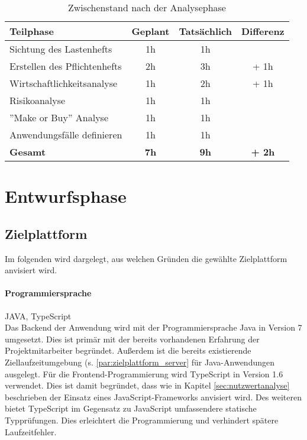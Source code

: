 \documentclass[12pt, xcolor=dvipsnames]{scrartcl}
\begin{document}
\begin{table}[H]
	\centering
	\begin{tabular}{lccc}

		\rowcolor{white!15}				
		\textbf{Teilphase} & \textbf{Geplant} & \textbf{Tatsächlich} & \textbf{Differenz} \\\hline		
		

		Sichtung des Lastenhefts & 1h & 1h & \\	    
	    Erstellen des Pflichtenhefts & 2h & 3h &  + 1h\\	    
	    Wirtschaftlichkeitsanalyse & 1h & 2h & + 1h\\	     
	    Risikoanalyse & 1h & 1h & \\	      
	    ''Make or Buy'' Analyse & 1h & 1h & \\	    
		Anwendungsfälle definieren & 1h & 1h & \\\hline

		\rowcolor{white!15}				
		\textbf{Gesamt} & \textbf{7h} & \textbf{9h} & \textbf{+ 2h} \\			

	    
	\end{tabular}
	\caption{Zwischenstand nach der Analysephase}
	\label{tab:zwischenstand_analysephase}
	\end{table}


\section{Entwurfsphase}

\subsection{Zielplattform}

Im folgenden wird dargelegt, aus welchen Gründen die gewählte Zielplattform anvisiert wird.

\paragraph{Programmiersprache} JAVA, TypeScript \\
Das Backend der Anwendung wird mit der Programmiersprache Java in Version 7 umgesetzt.
Dies ist primär mit der bereits vorhandenen Erfahrung der Projektmitarbeiter begründet. Außerdem ist die bereits existierende Ziellaufzeitumgebung (s. \ref{par:zielplattform_server} für Java-Anwendungen ausgelegt.
Für die Frontend-Programmierung wird TypeScript in Version 1.6 verwendet. Dies ist damit begründet, dass wie in Kapitel \ref{sec:nutzwertanalyse} beschrieben der Einsatz eines JavaScript-Frameworks anvisiert wird. Des weiteren bietet TypeScript im Gegensatz zu JavaScript umfassendere statische Typprüfungen. Dies erleichtert die Programmierung und verhindert spätere Laufzeitfehler.
\end{document}
